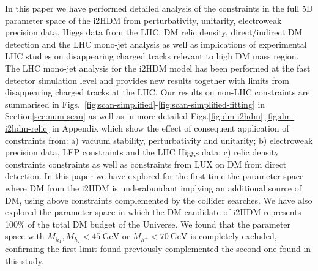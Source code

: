 \documentclass[12pt,a4paper]{article}
\newcommand {\blue} {\color{blue}}
\begin{document}
In this paper we have performed 
detailed analysis of the   constraints in the full 5D  parameter space of the i2HDM from perturbativity, unitarity,
electroweak precision data, Higgs data from the LHC,
DM relic density, direct/indirect DM detection and the LHC mono-jet analysis as well as 
implications of experimental LHC studies on disappearing
charged tracks relevant to high DM mass region.
The LHC mono-jet analysis for the i2HDM model has been performed at the fast detector simulation level
and provides new results together with limits from disappearing
charged tracks at the LHC.
{\blue Our results on non-LHC constraints are summarised in Figs.~\ref{fig:scan-simplified}-\ref{fig:scan-simplified-fitting} in Section\ref{sec:num-scan}
as well as in more detailed Figs.\ref{fig:dm-i2hdm}-\ref{fig:dm-i2hdm-relic}
in Appendix}
which show the effect of consequent application of constraints
from:  a) vacuum stability, perturbativity and unitarity;
b) electroweak precision data, LEP constraints and the LHC Higgs data;
c) relic density constraints constraints as well as constraints from LUX on DM from direct detection.
In this paper we have explored for the first time 
the parameter space where 
DM from the i2HDM is underabundant implying an additional source of DM,
using above constraints complemented by the  collider searches.
We have also explored  the parameter space in which the DM candidate of i2HDM represents 
100\% of the total DM budget of the Universe.
We found that the parameter space with  
$M_{h_1},M_{h_2}<45~\mbox{GeV} 
\mbox{\ or\ } M_{h^+}<70~\mbox{GeV}$
is completely excluded, confirming the first limit found previously
complemented the second one found in this study.
\end{document}
